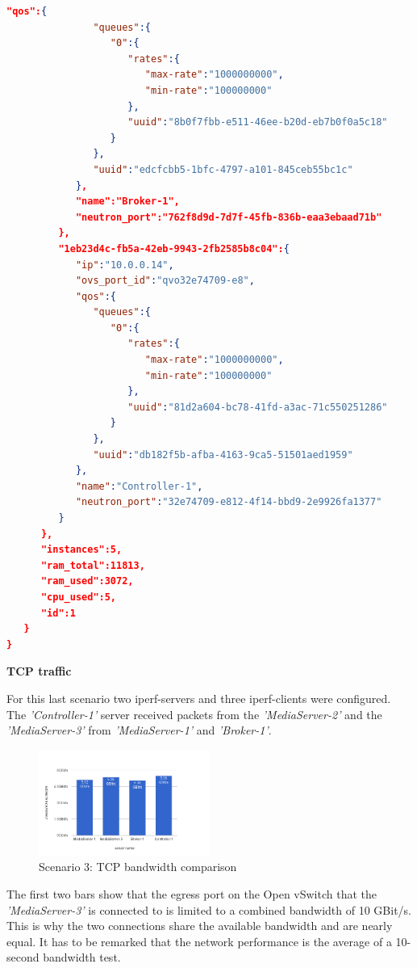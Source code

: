 \begin{lstlisting}[language=json,firstnumber=1]
            "qos":{  
               "queues":{  
                  "0":{  
                     "rates":{  
                        "max-rate":"1000000000",
                        "min-rate":"100000000"
                     },
                     "uuid":"8b0f7fbb-e511-46ee-b20d-eb7b0f0a5c18"
                  }
               },
               "uuid":"edcfcbb5-1bfc-4797-a101-845ceb55bc1c"
            },
            "name":"Broker-1",
            "neutron_port":"762f8d9d-7d7f-45fb-836b-eaa3ebaad71b"
         },
         "1eb23d4c-fb5a-42eb-9943-2fb2585b8c04":{  
            "ip":"10.0.0.14",
            "ovs_port_id":"qvo32e74709-e8",
            "qos":{  
               "queues":{  
                  "0":{  
                     "rates":{  
                        "max-rate":"1000000000",
                        "min-rate":"100000000"
                     },
                     "uuid":"81d2a604-bc78-41fd-a3ac-71c550251286"
                  }
               },
               "uuid":"db182f5b-afba-4163-9ca5-51501aed1959"
            },
            "name":"Controller-1",
            "neutron_port":"32e74709-e812-4f14-bbd9-2e9926fa1377"
         }
      },
      "instances":5,
      "ram_total":11813,
      "ram_used":3072,
      "cpu_used":5,
      "id":1
   }
}
\end{lstlisting}

\textbf{TCP traffic}

For this last scenario two iperf-servers and three iperf-clients were configured. The \textit{'Controller-1'} server received packets from the \textit{'MediaServer-2'} and the \textit{'MediaServer-3'} from \textit{'MediaServer-1'} and \textit{'Broker-1'}.

\begin{figure}[H]
\centering

\includegraphics[width=0.5\textwidth]{images/evaluation/testbed_scenario2_bw}

\caption{Scenario 3: TCP bandwidth comparison}
\end{figure}

The first two bars show that the egress port on the Open vSwitch that the \textit{'MediaServer-3'} is connected to is limited to a combined bandwidth of 10 GBit/s. This is why the two connections share the available bandwidth and are nearly equal. It has to be remarked that the network performance is the average of a 10-second bandwidth test.

